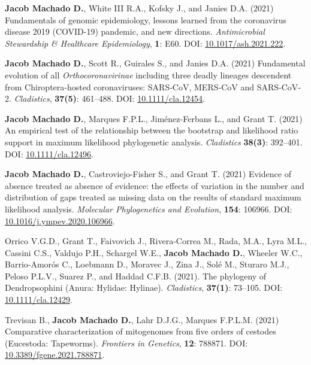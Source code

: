 \documentclass[11pt, letterpaper, sans]{moderncv}
\begin{document}
    {\setlength{\parskip}{.5em}\renewcommand{\baselinestretch}{2.0}\begin{hangparas}{.25in}{1}

		\textbf{Jacob Machado D.}, White III R.A., Kofsky J., and Janies D.A. (2021) Fundamentals of genomic epidemiology, lessons learned from the coronavirus disease 2019 (COVID-19) pandemic, and new directions. \textit{Antimicrobial Stewardship \& Healthcare Epidemiology}, \textbf{1}: E60. DOI: \href{https://doi.org/10.1017/ash.2021.222}{10.1017/ash.2021.222}.

		\textbf{Jacob Machado D.}, Scott R., Guirales S., and Janies D.A. (2021) Fundamental evolution of all \emph{Orthocoronavirinae} including three deadly lineages descendent from Chiroptera‐hosted coronaviruses: SARS‐CoV, MERS‐CoV and SARS‐CoV‐2. \emph{Cladistics}, \textbf{37(5)}: 461--488. DOI: \href{https://doi.org/10.1111/cla.12454}{10.1111/cla.12454}.

		\textbf{Jacob Machado D.}, Marques F.P.L., Jiménez-Ferbans L., and Grant T. (2021) An empirical test of the relationship between the bootstrap and likelihood ratio support in maximum likelihood phylogenetic analysis. \textit{Cladistics} \textbf{38(3)}: 392--401. DOI: \href{https://doi.org/10.1111/cla.12496}{10.1111/cla.12496}.

		\textbf{Jacob Machado D.}, Castroviejo-Fisher S., and Grant T. (2021) Evidence of absence treated as absence of evidence: the effects of variation in the number and distribution of gaps treated as missing data on the results of standard maximum likelihood analysis. \emph{Molecular Phylogenetics and Evolution}, \textbf{154}: 106966. DOI: \href{https://doi.org/10.1016/j.ympev.2020.106966}{10.1016/j.ympev.2020.106966}.

        Orrico V.G.D., Grant T., Faivovich J., Rivera‐Correa M., Rada, M.A., Lyra M.L., Cassini C.S., Valdujo P.H., Schargel W.E., \textbf{Jacob Machado D.}, Wheeler W.C., Barrio‐Amorós C., Loebmann D., Moravec J., Zina J., Solé M., Sturaro M.J., Peloso P.L.V., Suarez P., and Haddad C.F.B. (2021). The phylogeny of Dendropsophini (Anura: Hylidae: Hylinae). \emph{Cladistics}, \textbf{37(1)}: 73--105. DOI: \href{https://doi.org/10.1111/cla.12429}{10.1111/cla.12429}.

        Trevisan B., \textbf{Jacob Machado D.}, Lahr D.J.G., Marques F.P.L.M. (2021) Comparative characterization of mitogenomes from five orders of cestodes (Eucestoda: Tapeworms). \textit{Frontiers in Genetics}, \textbf{12}: 788871. DOI: \href{ https://doi.org/10.3389/fgene.2021.788871}{10.3389/fgene.2021.788871}.

	\end{hangparas}}
\end{document}
